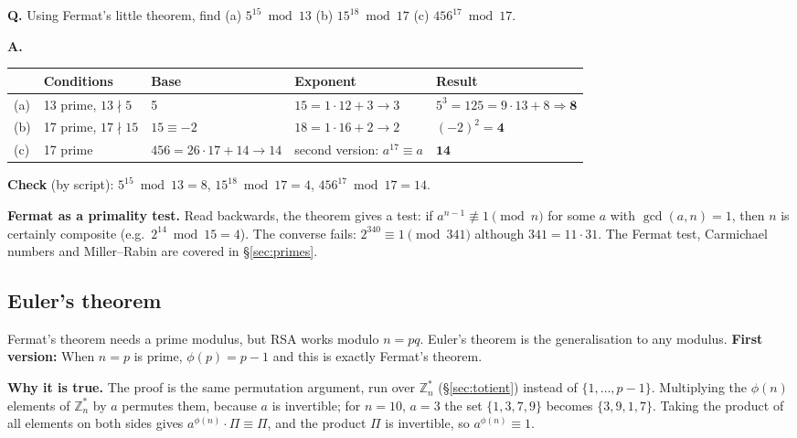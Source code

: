 \begin{worked}
\textbf{Q.} Using Fermat's little theorem, find (a) $5^{15} \bmod 13$ (b) $15^{18} \bmod 17$ (c) $456^{17} \bmod 17$.

\textbf{A.}
\begin{center}\small
\begin{tabular}{@{}lllll@{}}
\toprule
 & Conditions & Base & Exponent & Result\\
\midrule
(a) & 13 prime, $13 \nmid 5$ & 5 & $15 = 1\cdot12 + 3 \to 3$ & $5^3 = 125 = 9\cdot13 + 8 \Rightarrow \mathbf{8}$\\
(b) & 17 prime, $17 \nmid 15$ & $15 \equiv -2$ & $18 = 1\cdot16 + 2 \to 2$ & $(-2)^2 = \mathbf{4}$\\
(c) & 17 prime & $456 = 26\cdot17 + 14 \to 14$ & second version: $a^{17} \equiv a$ & $\mathbf{14}$\\
\bottomrule
\end{tabular}
\end{center}
\textbf{Check} (by script): $5^{15} \bmod 13 = 8$, $15^{18} \bmod 17 = 4$, $456^{17} \bmod 17 = 14$.
\end{worked}

\textbf{Fermat as a primality test.} Read backwards, the theorem gives a test: if $a^{n-1} \not\equiv 1 \pmod n$ for some $a$ with $\gcd(a, n) = 1$, then $n$ is certainly composite (e.g.\ $2^{14} \bmod 15 = 4$). The converse fails: $2^{340} \equiv 1 \pmod{341}$ although $341 = 11 \cdot 31$. The Fermat test, Carmichael numbers and Miller--Rabin are covered in \S\ref{sec:primes}.

\subsection{Euler's theorem \hot}
Fermat's theorem needs a prime modulus, but RSA works modulo $n = pq$. Euler's theorem is the generalisation to any modulus. \textbf{First version:}  When $n = p$ is prime, $\phi(p) = p - 1$ and this is exactly Fermat's theorem.

\textbf{Why it is true.} The proof is the same permutation argument, run over $\mathbb{Z}_n^*$ (\S\ref{sec:totient}) instead of $\{1, \dots, p-1\}$. Multiplying the $\phi(n)$ elements of $\mathbb{Z}_n^*$ by $a$ permutes them, because $a$ is invertible; for $n = 10$, $a = 3$ the set $\{1, 3, 7, 9\}$ becomes $\{3, 9, 1, 7\}$. Taking the product of all elements on both sides gives $a^{\phi(n)} \cdot \Pi \equiv \Pi$, and the product $\Pi$ is invertible, so $a^{\phi(n)} \equiv 1$.

